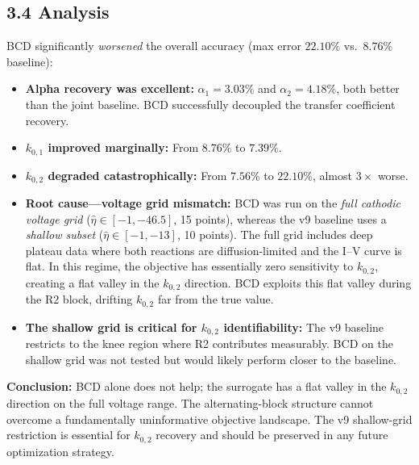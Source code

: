\documentclass[11pt]{article}
\begin{document}
\subsection*{3.4 Analysis}

BCD significantly \emph{worsened} the overall accuracy (max error $22.10\%$ vs.\
$8.76\%$ baseline):

\begin{itemize}
  \item \textbf{Alpha recovery was excellent:} $\alpha_1 = 3.03\%$ and
        $\alpha_2 = 4.18\%$, both better than the joint baseline.  BCD
        successfully decoupled the transfer coefficient recovery.

  \item \textbf{$k_{0,1}$ improved marginally:} From $8.76\%$ to $7.39\%$.

  \item \textbf{$k_{0,2}$ degraded catastrophically:} From $7.56\%$ to
        $22.10\%$, almost $3\times$ worse.

  \item \textbf{Root cause---voltage grid mismatch:} BCD was run on the
        \emph{full cathodic voltage grid} ($\hat\eta \in [-1, -46.5]$, 15
        points), whereas the v9 baseline uses a \emph{shallow subset}
        ($\hat\eta \in [-1, -13]$, 10 points).  The full grid includes deep
        plateau data where both reactions are diffusion-limited and the I--V
        curve is flat.  In this regime, the objective has essentially zero
        sensitivity to $k_{0,2}$, creating a flat valley in the $k_{0,2}$
        direction.  BCD exploits this flat valley during the R2 block, drifting
        $k_{0,2}$ far from the true value.

  \item \textbf{The shallow grid is critical for $k_{0,2}$ identifiability:}
        The v9 baseline restricts to the knee region where R2 contributes
        measurably.  BCD on the shallow grid was not tested but would likely
        perform closer to the baseline.
\end{itemize}

\textbf{Conclusion:} BCD alone does not help; the surrogate has a flat valley
in the $k_{0,2}$ direction on the full voltage range.  The alternating-block
structure cannot overcome a fundamentally uninformative objective landscape.
The v9 shallow-grid restriction is essential for $k_{0,2}$ recovery and should
be preserved in any future optimization strategy.


\end{document}
